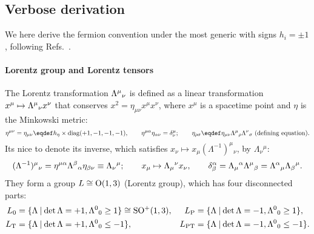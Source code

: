 \documentclass[CheatSheet]{subfiles}
\begin{document}
\newpage
\detailstyle

\subsection{Verbose derivation}
We here derive the fermion convention under the most generic with signs $h_i=\pm1$, following
Refs.~\cite{Kugo1}.

\paragraph{Lorentz group and Lorentz tensors}
The Lorentz transformation $\Lambda^{\mu}{}_{\nu}$ is defined as a linear transformation $x^\mu\mapsto\Lambda^{\mu}{}_{\nu} x^\nu$ that conserves $x^2=\eta_{\mu\nu}x^\mu x^\nu$, where $x^\mu$ is a spacetime point and $\eta$ is the Minkowski metric:
\begin{equation}
 \eta^{\mu\nu}=\eta_{\mu\nu}\eqdef h_\eta\times\diag(+1,-1,-1,-1),\qquad
 \eta^{\mu\alpha}\eta_{\alpha\nu}=\delta^{\mu}_\nu;\qquad
 \eta_{\rho\sigma}\eqdef\eta_{\mu\nu}\LorTr\mu\rho\LorTr\nu\sigma ~\text{(defining equation)}.
\label{eq:LorTr}
\end{equation}
Its nice to denote its inverse, which satisfies $x_\nu\mapsto x_\mu(\Lambda^{-1})^\mu{}_\nu$, by $\Lambda_\nu{}^\mu$:
\begin{equation}
 (\Lambda^{-1})^\mu{}_\nu = \eta^{\mu\alpha}\Lambda^{\beta}{}_{\alpha}\eta_{\beta\nu}
\equiv \Lambda_\nu{}^\mu;\qquad
x_\mu\mapsto \Lambda_\mu{}^\nu x_\nu,\qquad
\delta^\alpha_\beta
=\Lambda_\mu{}^\alpha\Lambda^{\mu}{}_{\beta}
=\Lambda^{\alpha}{}_{\mu} \Lambda_\beta{}^\mu.
\end{equation}
They form a group $L\cong\operatorname{\mathrm O}(1,3)$ (Lorentz group), which has four disconnected parts:
\begin{align}
 L\w 0  &=\{\Lambda\mathbin|\det\Lambda=+1, \LorTr00\ge1\}\cong \mathop{\mathrm{SO^+}}(1,3),&
 L\w P  &=\{\Lambda\mathbin|\det\Lambda=-1, \LorTr00\ge1\},\notag\\
 L\w T  &=\{\Lambda\mathbin|\det\Lambda=+1, \LorTr00\le-1\},&
 L\w{PT}&=\{\Lambda\mathbin|\det\Lambda=-1, \LorTr00\le-1\}.
\end{align}
\end{document}
